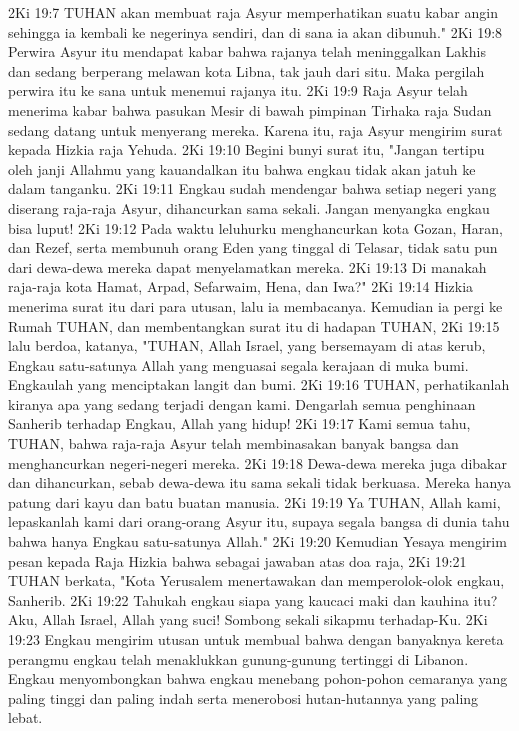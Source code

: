 2Ki 19:7  TUHAN akan membuat raja Asyur memperhatikan suatu kabar angin sehingga ia kembali ke negerinya sendiri, dan di sana ia akan dibunuh."
2Ki 19:8  Perwira Asyur itu mendapat kabar bahwa rajanya telah meninggalkan Lakhis dan sedang berperang melawan kota Libna, tak jauh dari situ. Maka pergilah perwira itu ke sana untuk menemui rajanya itu.
2Ki 19:9  Raja Asyur telah menerima kabar bahwa pasukan Mesir di bawah pimpinan Tirhaka raja Sudan sedang datang untuk menyerang mereka. Karena itu, raja Asyur mengirim surat kepada Hizkia raja Yehuda.
2Ki 19:10  Begini bunyi surat itu, "Jangan tertipu oleh janji Allahmu yang kauandalkan itu bahwa engkau tidak akan jatuh ke dalam tanganku.
2Ki 19:11  Engkau sudah mendengar bahwa setiap negeri yang diserang raja-raja Asyur, dihancurkan sama sekali. Jangan menyangka engkau bisa luput!
2Ki 19:12  Pada waktu leluhurku menghancurkan kota Gozan, Haran, dan Rezef, serta membunuh orang Eden yang tinggal di Telasar, tidak satu pun dari dewa-dewa mereka dapat menyelamatkan mereka.
2Ki 19:13  Di manakah raja-raja kota Hamat, Arpad, Sefarwaim, Hena, dan Iwa?"
2Ki 19:14  Hizkia menerima surat itu dari para utusan, lalu ia membacanya. Kemudian ia pergi ke Rumah TUHAN, dan membentangkan surat itu di hadapan TUHAN,
2Ki 19:15  lalu berdoa, katanya, "TUHAN, Allah Israel, yang bersemayam di atas kerub, Engkau satu-satunya Allah yang menguasai segala kerajaan di muka bumi. Engkaulah yang menciptakan langit dan bumi.
2Ki 19:16  TUHAN, perhatikanlah kiranya apa yang sedang terjadi dengan kami. Dengarlah semua penghinaan Sanherib terhadap Engkau, Allah yang hidup!
2Ki 19:17  Kami semua tahu, TUHAN, bahwa raja-raja Asyur telah membinasakan banyak bangsa dan menghancurkan negeri-negeri mereka.
2Ki 19:18  Dewa-dewa mereka juga dibakar dan dihancurkan, sebab dewa-dewa itu sama sekali tidak berkuasa. Mereka hanya patung dari kayu dan batu buatan manusia.
2Ki 19:19  Ya TUHAN, Allah kami, lepaskanlah kami dari orang-orang Asyur itu, supaya segala bangsa di dunia tahu bahwa hanya Engkau satu-satunya Allah."
2Ki 19:20  Kemudian Yesaya mengirim pesan kepada Raja Hizkia bahwa sebagai jawaban atas doa raja,
2Ki 19:21  TUHAN berkata, "Kota Yerusalem menertawakan dan memperolok-olok engkau, Sanherib.
2Ki 19:22  Tahukah engkau siapa yang kaucaci maki dan kauhina itu? Aku, Allah Israel, Allah yang suci! Sombong sekali sikapmu terhadap-Ku.
2Ki 19:23  Engkau mengirim utusan untuk membual bahwa dengan banyaknya kereta perangmu engkau telah menaklukkan gunung-gunung tertinggi di Libanon. Engkau menyombongkan bahwa engkau menebang pohon-pohon cemaranya yang paling tinggi dan paling indah serta menerobosi hutan-hutannya yang paling lebat.
